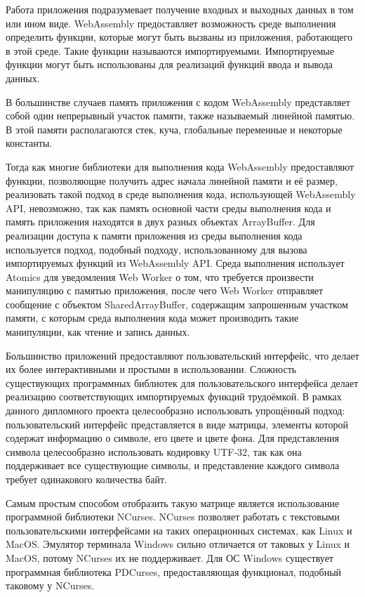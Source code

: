 Работа приложения подразумевает получение входных и выходных данных в том или ином виде.
WebAssembly предоставляет возможность среде выполнения определить функции, которые могут быть вызваны из приложения, работающего в этой среде.
Такие функции называются импортируемыми.
Импортируемые функции могут быть использованы для реализаций функций ввода и вывода данных.

В большинстве случаев память приложения с кодом WebAssembly представляет собой один непрерывный участок памяти, также называемый линейной памятью.
В этой памяти располагаются стек, куча, глобальные переменные и некоторые константы.

Тогда как многие библиотеки для выполнения кода WebAssembly предоставляют функции, позволяющие получить адрес начала линейной памяти и её размер, реализовать такой подход в среде выполнения кода, использующей WebAssembly API, невозможно, так как память основной части среды выполнения кода и память приложения находятся в двух разных объектах ArrayBuffer. 
Для реализации доступа к памяти приложения из среды выполнения кода используется подход, подобный подходу, использованному для вызова импортируемых функций из WebAssembly API.
Среда выполнения использует Atomics для уведомления Web Worker о том, что требуется произвести манипуляцию с памятью приложения, после чего Web Worker отправляет сообщение с объектом SharedArrayBuffer, содержащим запрошенным участком памяти, с которым среда выполнения кода может производить такие манипуляции, как чтение и запись данных.

Большинство приложений предоставляют пользовательский интерфейс, что делает их более интерактивными и простыми в использовании.
Сложность существующих программных библиотек для пользовательского интерфейса делает реализацию соответствующих импортируемых функций трудоёмкой.
В рамках данного дипломного проекта целесообразно использовать упрощённый подход: пользовательский интерфейс представляется в виде матрицы, элементы которой содержат информацию о символе, его цвете и цвете фона.
Для представления символа целесообразно использовать кодировку UTF-32, так как она поддерживает все существующие символы, и представление каждого символа требует одинакового количества байт.

Самым простым способом отобразить такую матрице является использование программной библиотеки NCurses.
NCurses позволяет работать с текстовыми пользовательскими интерфейсами на таких операционных системах, как Linux и MacOS.
Эмулятор терминала Windows сильно отличается от таковых у Linux и MacOS, потому NCurses их не поддерживает.
Для ОС Windows существует программная библиотека PDCurses, предоставляющая функционал, подобный таковому у NCurses.


